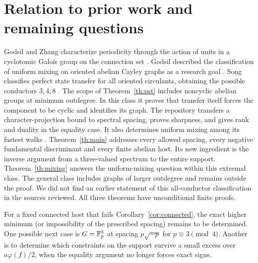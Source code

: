 \documentclass[11pt,letterpaper]{article}
\begin{document}
\section{Relation to prior work and remaining questions}
Godsil and Zhang characterize periodicity through the action of units in a cyclotomic Galois group on the connection set \cite{gz}. Godsil described the classification of uniform mixing on oriented abelian Cayley graphs as a research goal \cite{godsil}. Song classifies perfect state transfer for all oriented circulants, obtaining the possible conductors $3,4,8$ \cite{song}. The scope of Theorem~\ref{th:pst} includes noncyclic abelian groups at minimum outdegree. In this class it proves that transfer itself forces the component to be cyclic and identifies its graph. The repository transfers a character-projection bound to spectral spacing, proves sharpness, and gives rank and duality in the equality case. It also determines uniform mixing among its fastest walks \cite{repo}. Theorem~\ref{th:main} addresses every allowed spacing, every negative fundamental discriminant and every finite abelian host. Its new ingredient is the inverse argument from a three-valued spectrum to the entire support. Theorem~\ref{th:mixing} answers the uniform-mixing question within this extremal class. The general class includes graphs of larger outdegree and remains outside the proof. We did not find an earlier statement of this all-conductor classification in the sources reviewed. All three theorems have unconditional finite proofs.

For a fixed connected host that fails Corollary~\ref{cor:connected}, the exact higher minimum (or impossibility of the prescribed spacing) remains to be determined. One possible next case is $G=\mathbb F_p^3$ at spacing $p\sqrt{-p}$ for $p\equiv3\pmod4$. Another is to determine which constraints on the support survive a small excess over $a\varphi(f)/2$, when the equality argument no longer forces exact signs.

\clearpage
\end{document}
